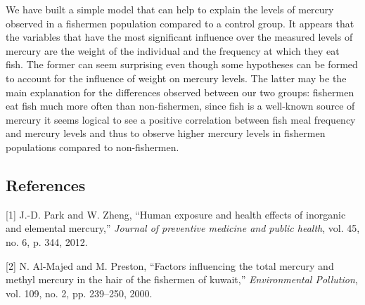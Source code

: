 \documentclass[12pt,]{article}
\begin{document}
We have built a simple model that can help to explain the levels of
mercury observed in a fishermen population compared to a control group.
It appears that the variables that have the most significant influence
over the measured levels of mercury are the weight of the individual and
the frequency at which they eat fish. The former can seem surprising
even though some hypotheses can be formed to account for the influence
of weight on mercury levels. The latter may be the main explanation for
the differences observed between our two groups: fishermen eat fish much
more often than non-fishermen, since fish is a well-known source of
mercury it seems logical to see a positive correlation between fish meal
frequency and mercury levels and thus to observe higher mercury levels
in fishermen populations compared to non-fishermen.

\subsection*{References}\label{references}

\hypertarget{refs}{}
\hypertarget{ref-park2012human}{}
{[}1{]} J.-D. Park and W. Zheng, ``Human exposure and health effects of
inorganic and elemental mercury,'' \emph{Journal of preventive medicine
and public health}, vol. 45, no. 6, p. 344, 2012.

\hypertarget{ref-al2000factors}{}
{[}2{]} N. Al-Majed and M. Preston, ``Factors influencing the total
mercury and methyl mercury in the hair of the fishermen of kuwait,''
\emph{Environmental Pollution}, vol. 109, no. 2, pp. 239--250, 2000.
\end{document}
